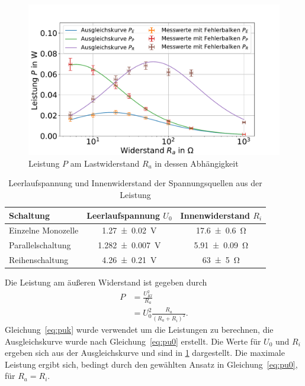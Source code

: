 \FloatBarrier

\begin{figure}[h]
	\centering
	\includegraphics[width=0.9\linewidth]{"auswertung/Auswertung Innenwiderstand/Batterie Gesamt P"}
	\caption{Leistung $P$ am Lastwiderstand $R_a$ in dessen Abhängigkeit}
	\label{fig:batt-ges-p}
\end{figure}



\begin{table}
	\caption{Leerlaufspannung und Innenwiderstand der Spannungsquellen aus der Leistung}
	\centering
	\begin{tabular}{|l||c|c|}
		\hline 
		Schaltung & Leerlaufspannung $U_0$ & Innenwiderstand $R_i$ \\ 
		\hline \hline
		Einzelne Monozelle	& \SI{1.27+-0.02}{V}  & \SI{17.6+-0.6}{\ohm } \\ 
		\hline  
		Parallelschaltung	& \SI{1.282+-0.007}{V } &\SI{5.91+-0.09}{\ohm }  \\ 
		\hline   
		Reihenschaltung	& \SI{4.26+-0.21}{V } &\SI{63+-5}{\ohm }  \\ 
		\hline 
	\end{tabular} 
	
	\label{tab:batt-U-P}
	
\end{table}


Die Leistung am äußeren Widerstand ist gegeben durch 
\begin{align}
 P &=\frac{U_{Kl}^2}{R_a} \label{eq:puk}\\
 &= U_0^2 \frac{R_a}{(R_a+R_i)^2} \label{eq:pu0}.
\end{align} 
Gleichung~\ref{eq:puk} wurde verwendet um die Leistungen zu berechnen, die Ausgleichskurve wurde nach Gleichung~\ref{eq:pu0} erstellt.
Die Werte für $U_0$ und $R_i$ ergeben sich aus der Ausgleichskurve und sind in \cref{tab:batt-U-P} dargestellt. Die maximale Leistung ergibt sich, bedingt durch den gewählten Ansatz in Gleichung~\ref{eq:pu0}, für $R_a=R_i$.\\







